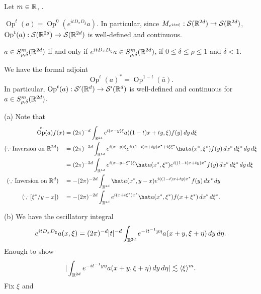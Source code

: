 \documentclass{../../large}
\DeclareMathOperator{\Op}{Op}
\begin{document}
\begin{prb}
Let $m\in\mathbb{R}$, .
\begin{parts}
\item $\Op^t(a)=\Op^0(e^{itD_xD_\xi}a)$.
In particular, since $M_{e^{itx\xi}}:\mathcal{S}(\mathbb{R}^{2d})\to\mathcal{S}(\mathbb{R}^{2d})$, $\Op^t(a):\cS(\R^{2d})\to\cS(\R^{2d})$ is well-defined and continuous.
\item $a\in S_{\rho,\delta}^m(\mathbb{R}^{2d})$ if and only if $e^{itD_xD_\xi}a\in S_{\rho,\delta}^m(\mathbb{R}^{2d})$, if $0\le\delta\le\rho\le1$ and $\delta<1$.
\item We have the formal adjoint
\[\Op^t(a)^*=\Op^{1-t}(\bar a).\]
In particular, $\Op^t(a):\cS'(\R^d)\to\cS'(\R^d)$ is well-defined and continuous for $a\in S_{\rho,\delta}^m(\mathbb{R}^{2d})$.
\end{parts}
\end{prb}

\begin{pf}
(a)
Note that
\begin{align*}
\Op^t(a)f(x)
&=(2\pi)^{-d}\int_{\R^{2d}}e^{i(x-y)\xi}a((1-t)x+ty,\xi)f(y)\,dy\,d\xi\\
(\because\text{Inversion on }\R^{2d})\quad
&=(2\pi)^{-3d}\int_{\R^{4d}}e^{i(x-y)\xi}e^{i((1-t)x+ty)x^*+i\xi\xi^*}\hat a(x^*,\xi^*)f(y)\,dx^*\,d\xi^*\,dy\,d\xi\\
&=(2\pi)^{-3d}\int_{\R^{4d}}e^{i(x-y+\xi^*)\xi}\hat a(x^*,\xi^*)e^{i((1-t)x+ty)x^*}f(y)\,dx^*\,d\xi^*\,dy\,d\xi\\
(\because\text{Inversion on }\R^d)\quad
&=-(2\pi)^{-2d}\int_{\R^{2d}}\hat a(x^*,y-x)e^{i((1-t)x+ty)x^*}f(y)\,dx^*\,dy\\
(\because[\xi^*/y-x])\quad
&=-(2\pi)^{-2d}\int_{\R^{2d}}e^{i(x+t\xi^*)x^*}\hat a(x^*,\xi^*)f(x+\xi^*)\,dx^*\,d\xi^*.
\end{align*}

(b)
We have the oscillatory integral
\[e^{itD_xD_\xi}a(x,\xi)=(2\pi)^{-d}|t|^{-d}\int_{\mathbb{R}^{2d}}e^{-it^{-1}y\eta}a(x+y,\xi+\eta)\,dy\,d\eta.\]
Enough to show
\[|\int_{\mathbb{R}^{2d}}e^{-it^{-1}y\eta}a(x+y,\xi+\eta)\,dy\,d\eta|\lesssim\langle\xi\rangle^m.\]
Fix $\xi$ and
\delta\le\rho
\end{pf}
\end{document}
